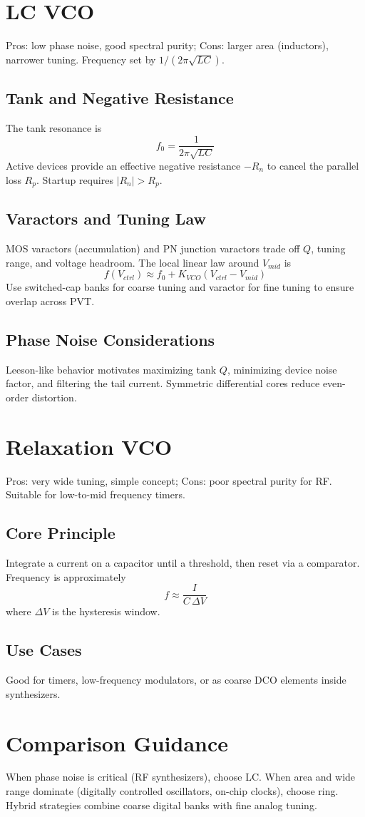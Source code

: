 \section{LC VCO}
Pros: low phase noise, good spectral purity; Cons: larger area (inductors), narrower tuning. Frequency set by \(1/(2\pi\sqrt{LC})\).
\subsection*{Tank and Negative Resistance}
The tank resonance is
\[
 f_0 = \frac{1}{2\pi\sqrt{LC}}
\]
Active devices provide an effective negative resistance \(-R_n\) to cancel the parallel loss \(R_p\). Startup requires \(|R_n|>R_p\).
\subsection*{Varactors and Tuning Law}
MOS varactors (accumulation) and PN junction varactors trade off \(Q\), tuning range, and voltage headroom. The local linear law around \(V_{mid}\) is
\[
 f(V_{ctrl}) \approx f_0 + K_{VCO}(V_{ctrl}-V_{mid})
\]
Use switched-cap banks for coarse tuning and varactor for fine tuning to ensure overlap across PVT.
\subsection*{Phase Noise Considerations}
Leeson-like behavior motivates maximizing tank \(Q\), minimizing device noise factor, and filtering the tail current. Symmetric differential cores reduce even-order distortion.
\section{Relaxation VCO}
Pros: very wide tuning, simple concept; Cons: poor spectral purity for RF. Suitable for low-to-mid frequency timers.
\subsection*{Core Principle}
Integrate a current on a capacitor until a threshold, then reset via a comparator. Frequency is approximately
\[
 f \approx \frac{I}{C\,\Delta V}
\]
where \(\Delta V\) is the hysteresis window.
\subsection*{Use Cases}
Good for timers, low-frequency modulators, or as coarse DCO elements inside synthesizers.
\section{Comparison Guidance}
When phase noise is critical (RF synthesizers), choose LC. When area and wide range dominate (digitally controlled oscillators, on-chip clocks), choose ring. Hybrid strategies combine coarse digital banks with fine analog tuning.

